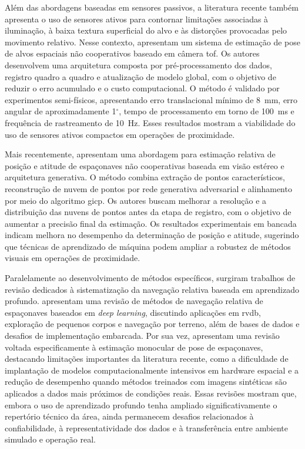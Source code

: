Além das abordagens baseadas em sensores passivos, a literatura recente também apresenta o uso de sensores ativos para contornar limitações associadas à iluminação, à baixa textura superficial do alvo e às distorções provocadas pelo movimento relativo. Nesse contexto, \cite{sun2022tof} apresentam um sistema de estimação de pose de alvos espaciais não cooperativos baseado em câmera \gls{tof}.
Os autores desenvolvem uma arquitetura composta por pré-processamento dos dados, registro quadro a quadro e atualização de modelo global, com o objetivo de reduzir o erro acumulado e o custo computacional. O método é validado por experimentos semi-físicos, apresentando erro translacional mínimo de 8~mm, erro angular de aproximadamente 1$^\circ$, tempo de processamento em torno de 100~ms e frequência de rastreamento de 10~Hz. Esses resultados mostram a viabilidade do uso de sensores ativos compactos em operações de proximidade.

Mais recentemente, \cite{gavilanez2024vision} apresentam uma abordagem para estimação relativa de posição e atitude de espaçonaves não cooperativas baseada em visão estéreo e arquitetura generativa. O método combina extração de pontos característicos, reconstrução de nuvem de pontos por rede generativa adversarial e alinhamento por meio do algoritmo \gls{gicp}.
Os autores buscam melhorar a resolução e a distribuição das nuvens de pontos antes da etapa de registro, com o objetivo de aumentar a precisão final da estimação. Os resultados experimentais em bancada indicam melhora no desempenho da determinação de posição e atitude, sugerindo que técnicas de aprendizado de máquina podem ampliar a robustez de métodos visuais em operações de proximidade.

Paralelamente ao desenvolvimento de métodos específicos, surgiram trabalhos de revisão dedicados à sistematização da navegação relativa baseada em aprendizado profundo. \cite{song2022survey} apresentam uma revisão de métodos de navegação relativa de espaçonaves baseados em \textit{deep learning}, discutindo aplicações em \gls{rvdb}, exploração de pequenos corpos e navegação por terreno, além de bases de dados e desafios de implementação embarcada. Por sua vez, \cite{pauly2023survey} apresentam uma revisão voltada especificamente à estimação monocular de pose de espaçonaves, destacando limitações importantes da literatura recente, como a dificuldade de implantação de modelos computacionalmente intensivos em hardware espacial e a redução de desempenho quando métodos treinados com imagens sintéticas são aplicados a dados mais próximos de condições reais. Essas revisões mostram que, embora o uso de aprendizado profundo tenha ampliado significativamente o repertório técnico da área, ainda permanecem desafios relacionados à confiabilidade, à representatividade dos dados e à transferência entre ambiente simulado e operação real.

